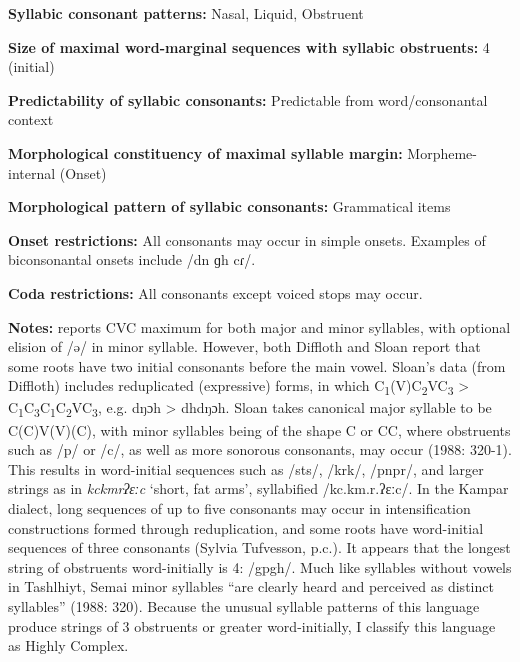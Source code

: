 \textbf{Syllabic consonant patterns:} Nasal, Liquid, Obstruent



\textbf{Size of maximal word{}-marginal sequences with syllabic obstruents:} 4 (initial)



\textbf{Predictability of syllabic consonants:} Predictable from word/consonantal context



\textbf{Morphological constituency of maximal syllable margin:} Morpheme-internal (Onset)



\textbf{Morphological pattern of syllabic consonants:} Grammatical items



\textbf{Onset restrictions:} All consonants may occur in simple onsets. Examples of biconsonantal onsets include /dn ɡh cɾ/.



\textbf{Coda restrictions:} All consonants except voiced stops may occur.



\textbf{Notes:} \citet{Philips2007} reports CVC maximum for both major and minor syllables, with optional elision of /ə/ in minor syllable. However, both Diffloth and Sloan report that some roots have two initial consonants before the main vowel. Sloan’s data (from Diffloth) includes reduplicated (expressive) forms, in which C\textsubscript{1}(V)C\textsubscript{2}VC\textsubscript{3} > C\textsubscript{1}C\textsubscript{3}C\textsubscript{1}C\textsubscript{2}VC\textsubscript{3}, e.g. dŋɔh > dhdŋɔh. Sloan takes canonical major syllable to be C(C)V(V)(C), with minor syllables being of the shape C or CC, where obstruents such as /p/ or /c/, as well as more sonorous consonants, may occur (1988: 320-1). This results in word-initial sequences such as /sts/, /krk/, /pnpr/, and larger strings as in \textit{kckmrʔɛːc} ‘short, fat arms’, syllabified /kc.km.r.ʔɛːc/. In the Kampar dialect, long sequences of up to five consonants may occur in intensification constructions formed through reduplication, and some roots have word-initial sequences of three consonants (Sylvia Tufvesson, p.c.). It appears that the longest string of obstruents word-initially is 4: /gpgh/. Much like syllables without vowels in Tashlhiyt, Semai minor syllables “are clearly heard and perceived as distinct syllables” (1988: 320). Because the unusual syllable patterns of this language produce strings of 3 obstruents or greater word-initially, I classify this language as Highly Complex.



